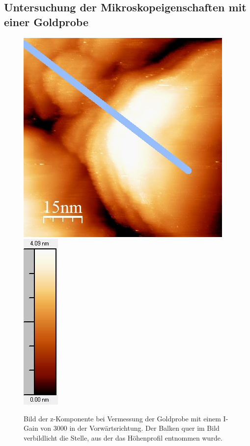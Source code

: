 \documentclass[12pt,a4paper]{article}
\begin{document}
\subsection{Untersuchung der Mikroskopeigenschaften mit einer Goldprobe}

\begin{figure}
\centering
\includegraphics[scale=0.8]{Bilder/Anhang/IGain/3000_IGain_vor.jpg}
\includegraphics[scale=0.8]{Bilder/Anhang/IGain/3000_IGain_vor_Skala.jpg}
\caption{Bild der z-Komponente bei Vermessung der Goldprobe mit einem I-Gain von 3000 in der Vorwärtsrichtung. Der Balken quer im Bild verbildlicht die Stelle, aus der das Höhenprofil entnommen wurde.}
\label{fig:Gold_IGain_Beispiel}
\end{figure}
\end{document}
